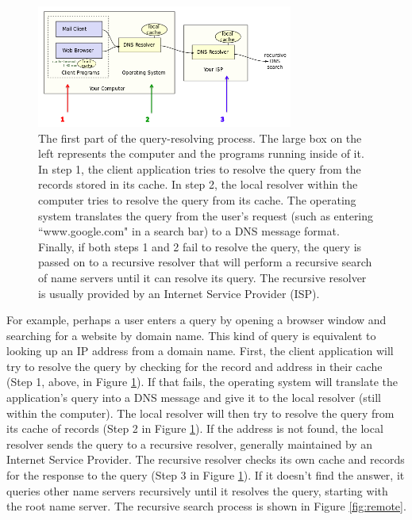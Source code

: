 \documentclass[11pt,a4paper]{article}
\begin{document}
\begin{figure}
	
    \centering
    	\includegraphics[width=0.75\textwidth]{query2.png}
    \caption{The first part of the query-resolving process. The large box on the left represents the computer and the programs running inside of it. In step 1, the client application tries to resolve the query from the records stored in its cache. In step 2, the local resolver within the computer tries to resolve the query from its cache. The operating system translates the query from the user's request (such as entering ``www.google.com" in a search bar) to a DNS message format. Finally, if both steps 1 and 2 fail to resolve the query, the query is passed on to a recursive resolver that will perform a recursive search of name servers until it can resolve its query. The recursive resolver is usually provided by an Internet Service Provider (ISP). }
    \label{fig:local}
\end{figure}

For example, perhaps a user enters a query by opening a browser window and searching for a website by domain name. 
This kind of query is equivalent to looking up an IP address from a domain name.
First, the client application will try to resolve the query by checking for the record and address in their cache (Step 1, above, in Figure \ref{fig:local}).
If that fails, the operating system will translate the application's query into a DNS message and give it to the local resolver (still within the computer).
The local resolver will then try to resolve the query from its cache of records (Step 2 in Figure \ref{fig:local}).
If the address is not found, the local resolver sends the query to a recursive resolver, generally maintained by an Internet Service Provider. 
The recursive resolver checks its own cache and records for the response to the query (Step 3 in Figure \ref{fig:local}). 
If it doesn't find the answer, it queries other name servers recursively until it resolves the query, starting with the root name server. 
The recursive search process is shown in Figure \ref{fig:remote}.
\end{document}
